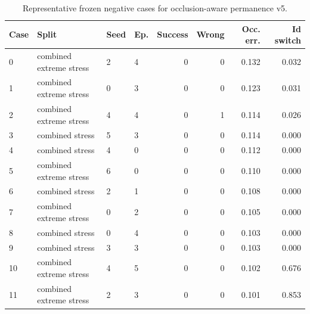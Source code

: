\begin{table}[t]
\centering
\caption{Representative frozen negative cases for occlusion-aware permanence v5.}
\label{tab:negative-cases}
\scriptsize
\begin{tabular}{llllrrrr}
\toprule
Case & Split & Seed & Ep. & Success & Wrong & Occ. err. & Id switch \\
\midrule
0 & combined extreme stress & 2 & 4 & 0 & 0 & 0.132 & 0.032 \\
1 & combined extreme stress & 0 & 3 & 0 & 0 & 0.123 & 0.031 \\
2 & combined extreme stress & 4 & 4 & 0 & 1 & 0.114 & 0.026 \\
3 & combined stress & 5 & 3 & 0 & 0 & 0.114 & 0.000 \\
4 & combined stress & 4 & 0 & 0 & 0 & 0.112 & 0.000 \\
5 & combined extreme stress & 6 & 0 & 0 & 0 & 0.110 & 0.000 \\
6 & combined stress & 2 & 1 & 0 & 0 & 0.108 & 0.000 \\
7 & combined extreme stress & 0 & 2 & 0 & 0 & 0.105 & 0.000 \\
8 & combined stress & 0 & 4 & 0 & 0 & 0.103 & 0.000 \\
9 & combined stress & 3 & 3 & 0 & 0 & 0.103 & 0.000 \\
10 & combined extreme stress & 4 & 5 & 0 & 0 & 0.102 & 0.676 \\
11 & combined extreme stress & 2 & 3 & 0 & 0 & 0.101 & 0.853 \\
\bottomrule
\end{tabular}
\end{table}
